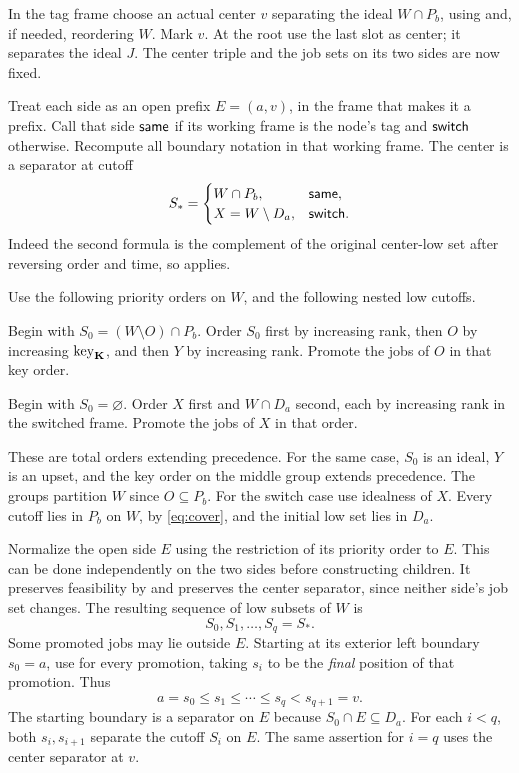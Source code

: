 In the tag frame choose an actual center \(v\) separating
the ideal \(W\cap P_b\), using  and, if needed,
reordering \(W\). Mark \(v\). At the root use the last slot as
center; it separates the ideal \(J\).
The center triple and the job sets on its two sides are now fixed.

Treat each side as an open prefix \(E=(a,v)\), in the frame that
makes it a prefix. Call that side \(\mathsf{same}\) if its working frame is
the node's tag and \(\mathsf{switch}\) otherwise. Recompute all boundary
notation in that working frame. The center is a separator at cutoff
\begin{equation}
 S_*=
 \begin{cases}
 W\cap P_b,&\mathsf{same},\\
 X=W\setminus D_a,&\mathsf{switch}.
 \end{cases}
 \label{eq:center-cutoff}
\end{equation}
Indeed the second formula is the complement of the original center-low
set after reversing order and time, so
 applies.

Use the following priority orders on \(W\), and the following nested
low cutoffs.
\begin{description}[style=nextline,leftmargin=1.5em]
 \item[Same direction.]
 Begin with \(S_0=(W\setminus O)\cap P_b\).
 Order \(S_0\) first by increasing rank, then \(O\) by increasing
 \(\operatorname{key}_{\mathbf K}\), and then \(Y\) by increasing rank.
 Promote the jobs of \(O\) in that key order.
 \item[Switched direction.]
 Begin with \(S_0=\varnothing\).
 Order \(X\) first and \(W\cap D_a\) second, each by increasing
 rank in the switched frame.
 Promote the jobs of \(X\) in that order.
\end{description}
These are total orders extending precedence.
For the same case, \(S_0\) is an ideal, \(Y\) is an upset,
and the key order on the middle group extends precedence.
The groups partition \(W\) since \(O\subseteq P_b\).
For the switch case use idealness of \(X\).
Every cutoff lies in \(P_b\) on \(W\), by \eqref{eq:cover},
and the initial low set lies in \(D_a\).

Normalize the open side \(E\) using the restriction of its priority
order to \(E\). This can be done independently on the two sides
before constructing children. It preserves feasibility by
 and preserves the center separator, since neither
side's job set changes.
The resulting sequence of low subsets of \(W\) is
\[
 S_0,S_1,\ldots,S_q=S_* .
\]
Some promoted jobs may lie outside \(E\).
Starting at its exterior left boundary \(s_0=a\), use
 for every promotion, taking \(s_i\) to be the
\emph{final} position of that promotion. Thus
\begin{equation}
 a=s_0\le s_1\le\cdots\le s_q<s_{q+1}=v.
 \label{eq:positions}
\end{equation}
The starting boundary is a separator on \(E\) because
\(S_0\cap E\subseteq D_a\).
For each \(i<q\), both \(s_i,s_{i+1}\) separate the cutoff \(S_i\)
on \(E\). The same assertion for \(i=q\) uses the center separator
at \(v\).

